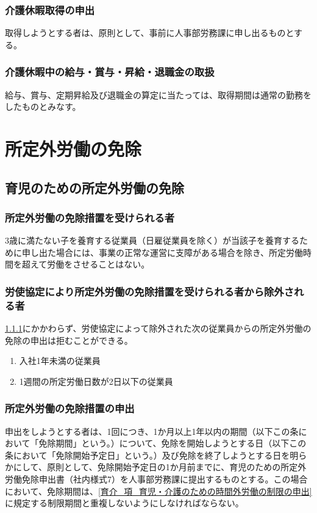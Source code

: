 \documentclass{jsarticle}
\begin{document}
\subsubsection{介護休暇取得の申出}
\label{育介_項_介護休暇取得の申出}
取得しようとする者は、原則として、事前に人事部労務課に申し出るものとする。 

\subsubsection{介護休暇中の給与・賞与・昇給・退職金の取扱}
\label{育介_項_介護休暇中の給与・賞与・昇給・退職金の取扱}
給与、賞与、定期昇給及び退職金の算定に当たっては、取得期間は通常の勤務をしたものとみなす。

\section{所定外労働の免除}

\subsection{育児のための所定外労働の免除}
\label{育介_条_育児のための所定外労働の免除}

\subsubsection{所定外労働の免除措置を受けられる者}
\label{育介_項_所定外労働の免除措置を受けられる者}
3歳に満たない子を養育する従業員（日雇従業員を除く）が当該子を養育するために申し出た場合には、事業の正常な運営に支障がある場合を除き、所定労働時間を超えて労働をさせることはない。 

\subsubsection{労使協定により所定外労働の免除措置を受けられる者から除外される者}
\label{育介_項_労使協定により所定外労働の免除措置を受けられる者から除外される者}
\ref{育介_項_所定外労働の免除措置を受けられる者}にかかわらず、労使協定によって除外された次の従業員からの所定外労働の免除の申出は拒むことができる。 
\begin{enumerate}
  \item 入社1年未満の従業員
  \item 1週間の所定労働日数が2日以下の従業員
\end{enumerate}

\subsubsection{所定外労働の免除措置の申出}
\label{育介_項_所定外労働の免除措置の申出}
申出をしようとする者は、1回につき、1か月以上1年以内の期間（以下この条において「免除期間」という。）について、免除を開始しようとする日（以下この条において「免除開始予定日」という。）及び免除を終了しようとする日を明らかにして、原則として、免除開始予定日の1か月前までに、育児のための所定外労働免除申出書（社内様式7）を人事部労務課に提出するものとする。この場合において、免除期間は、\ref{育介_項_育児・介護のための時間外労働の制限の申出}に規定する制限期間と重複しないようにしなければならない。
\end{document}
